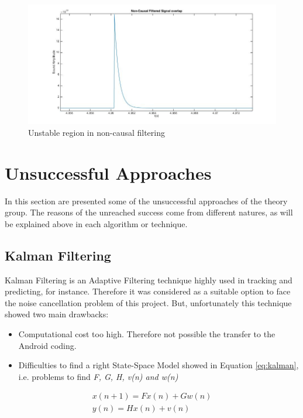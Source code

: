 \documentclass[11pt,a4paper,spanish]{book}  %
\theoremstyle{definition}  %
\theoremstyle{plain}  %
\theoremstyle{remark}  %
\begin{document}
		\begin{figure}[h]
		\centering
		\includegraphics[width=15cm]{images/theory/noncunstableoverlap.jpg}
		\caption{Unstable region in non-causal filtering}
		\label{fig:noncunstableoverlap}
		\end{figure}		
	


\section{Unsuccessful Approaches}

In this section are presented some of the unsuccessful approaches of the theory group. The reasons of the unreached success come from different natures, as will be explained above in each algorithm or technique.

	\subsection{Kalman Filtering}
	Kalman Filtering is an Adaptive Filtering technique highly used in tracking and predicting, for instance. Therefore it was considered as a suitable option to face the noise cancellation problem of this project. But, unfortunately this technique showed two main drawbacks:
	
	\begin{itemize}
	\item Computational cost too high. Therefore not possible the transfer to the Android coding.
	\item Difficulties to find a right State-Space Model showed in Equation \ref{eq:kalman}, i.e. problems to find \textit{F, G, H, v(n) and w(n)}
	\end{itemize}
	
	
	\begin{subequations}
	\label{eq:kalman}
	\begin{align}
	x(n+1)=Fx(n)+Gw(n)\\
	y(n)=Hx(n)+v(n)	
	\end{align}
	
	\end{subequations}
	
\end{document}
